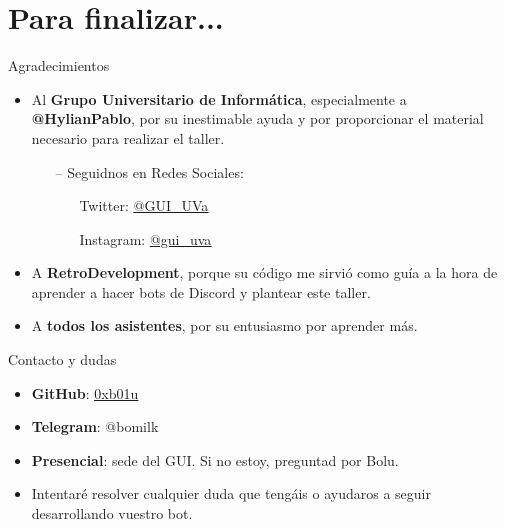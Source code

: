 \documentclass[10pt]{beamer} %
\begin{document}
\section{Para finalizar...}
\begin{frame}{Agradecimientos}
\begin{itemize}
    \item Al \textbf{Grupo Universitario de Informática}, especialmente a \textbf{@HylianPablo}, por su inestimable ayuda y por proporcionar el material necesario para realizar el taller.
    \begin{itemize}
        \item[--] Seguidnos en Redes Sociales:
        \begin{itemize}
            \item[] Twitter: \href{https://twitter.com/GUI\_UVa}{\underline{@GUI\_UVa}}
            \item[] Instagram: \href{https://www.instagram.com/gui_uva/}{\underline{@gui\_uva}}
        \end{itemize}
    \end{itemize}
    \item A \textbf{RetroDevelopment}, porque  su código me sirvió como guía a la hora de aprender a hacer bots de Discord y plantear este taller.
    \item A \textbf{todos los asistentes}, por su entusiasmo por aprender más.
\end{itemize}
\end{frame}
\begin{frame}{Contacto y dudas}
\begin{itemize}
    \item \textbf{GitHub}: \href{https://github.com/0xb01u}{\underline{0xb01u}}
    \item \textbf{Telegram}: @bomilk
    \item \textbf{Presencial}: sede del GUI. Si no estoy, preguntad por Bolu.
    \item Intentaré resolver cualquier duda que tengáis o ayudaros a seguir desarrollando vuestro bot.
\end{itemize}
\end{frame}
\end{document}
